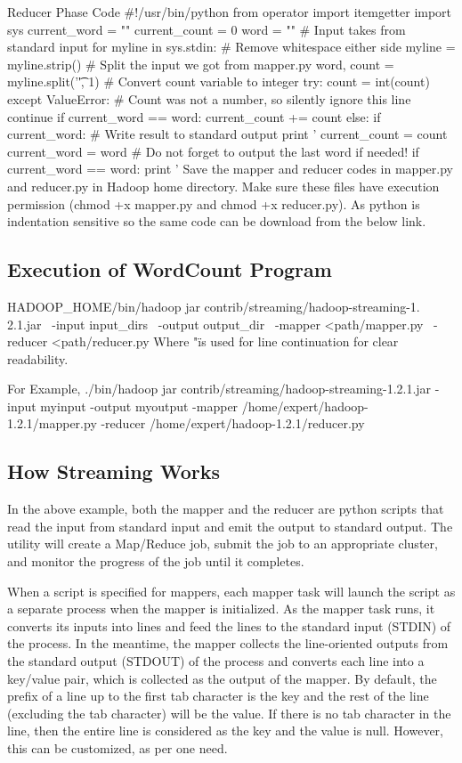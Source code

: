 Reducer Phase Code
#!/usr/bin/python
from operator import itemgetter 
import sys 
current_word = ""
current_count = 0 
word = "" 
# Input takes from standard input for myline in sys.stdin: 
# Remove whitespace either side myline = myline.strip() 
# Split the input we got from mapper.py word, count = myline.split('\t', 1) 
# Convert count variable to integer 
   try: 
      count = int(count) 
except ValueError: 
   # Count was not a number, so silently ignore this line continue
if current_word == word: 
   current_count += count 
else: 
   if current_word: 
      # Write result to standard output print '%
   current_count = count
   current_word = word
# Do not forget to output the last word if needed! 
if current_word == word: 
   print '%
Save the mapper and reducer codes in mapper.py and reducer.py in Hadoop home directory. Make sure these files have execution permission (chmod +x mapper.py and chmod +x reducer.py). As python is indentation sensitive so the same code can be download from the below link.

\subsection{Execution of WordCount Program}
$ $HADOOP_HOME/bin/hadoop jar contrib/streaming/hadoop-streaming-1.
2.1.jar \
   -input input_dirs \ 
   -output output_dir \ 
   -mapper <path/mapper.py \ 
   -reducer <path/reducer.py
Where "\" is used for line continuation for clear readability.

For Example,
./bin/hadoop jar contrib/streaming/hadoop-streaming-1.2.1.jar -input myinput -output myoutput -mapper /home/expert/hadoop-1.2.1/mapper.py -reducer /home/expert/hadoop-1.2.1/reducer.py
\subsection{How Streaming Works}
In the above example, both the mapper and the reducer are python scripts that read the input from standard input and emit the output to standard output. The utility will create a Map/Reduce job, submit the job to an appropriate cluster, and monitor the progress of the job until it completes.

When a script is specified for mappers, each mapper task will launch the script as a separate process when the mapper is initialized. As the mapper task runs, it converts its inputs into lines and feed the lines to the standard input (STDIN) of the process. In the meantime, the mapper collects the line-oriented outputs from the standard output (STDOUT) of the process and converts each line into a key/value pair, which is collected as the output of the mapper. By default, the prefix of a line up to the first tab character is the key and the rest of the line (excluding the tab character) will be the value. If there is no tab character in the line, then the entire line is considered as the key and the value is null. However, this can be customized, as per one need.


